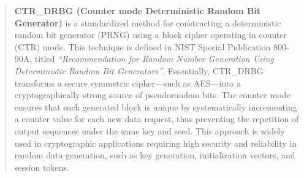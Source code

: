 \begin{quote}
\textbf{CTR\_DRBG (Counter mode Deterministic Random Bit Generator)} is a standardized method for constructing a deterministic random bit generator (PRNG) using a block cipher operating in counter (CTR) mode. This technique is defined in NIST Special Publication 800-90A, titled \textit{``Recommendation for Random Number Generation Using Deterministic Random Bit Generators''}. Essentially, CTR\_DRBG transforms a secure symmetric cipher---such as AES---into a cryptographically strong source of pseudorandom bits. The counter mode ensures that each generated block is unique by systematically incrementing a counter value for each new data request, thus preventing the repetition of output sequences under the same key and seed. This approach is widely used in cryptographic applications requiring high security and reliability in random data generation, such as key generation, initialization vectors, and session tokens.
\end{quote}

